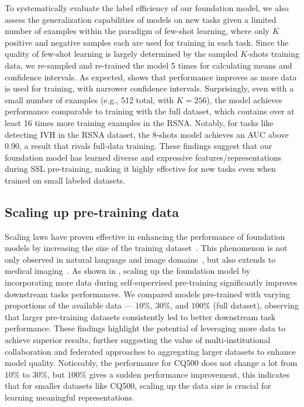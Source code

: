\documentclass[fleqn,10pt]{wlscirep}
\begin{document}
To systematically evaluate the label efficiency of our foundation model, we also assess the generalization capabilities of models on new tasks given a limited number of examples within the paradigm of few-shot learning, where only $K$ positive and negative samples each are used for training in each task. Since the quality of few-shot learning is largely determined by the sampled $K$-shots training data, we re-sampled and re-trained the model 5 times for calculating means and confidence intervals. As expected,  shows that performance improves as more data is used for training, with narrower confidence intervals. Surprisingly, even with a small number of examples (e.g., 512 total, with $K=256$), the model achieves performance comparable to training with the full dataset, which contains over at least 16 times more training examples in the RSNA. Notably, for tasks like detecting IVH in the RSNA dataset, the 8-shots model achieves an AUC above 0.90, a result that rivals full-data training. These findings suggest that our foundation model has learned diverse and expressive features/representations during SSL pre-training, making it highly effective for new tasks even when trained on small labeled datasets.



\subsection*{Scaling up pre-training data}

Scaling laws have proven effective in enhancing the performance of foundation models by increasing the size of the training dataset~\cite{kaplan2020scalinglawsneurallanguage}. This phenomenon is not only observed in natural language and image domains~\cite{zhai22scalingvit, pmlr-v202-dehghani23a}, but also extends to medical imaging~\cite{zhou2023foundation, li2024well}. As shown in , scaling up the foundation model by incorporating more data during self-supervised pre-training significantly improves downstream tasks performances. We compared models pre-trained with varying proportions of the available data --- $10\%$, $30\%$, and $100\%$ (full dataset), observing that larger pre-training datasets consistently led to better downstream task performance. These findings highlight the potential of leveraging more data to achieve superior results, further suggesting the value of multi-institutional collaboration and federated approaches to aggregating larger datasets to enhance model quality. Noticeably, the performance for CQ500 does not change a lot from $10\%$ to $30\%$, but $100\%$ gives a sudden performance improvement, this indicates that for smaller datasets like CQ500, scaling up the data size is crucial for learning meaningful representations.
\end{document}
